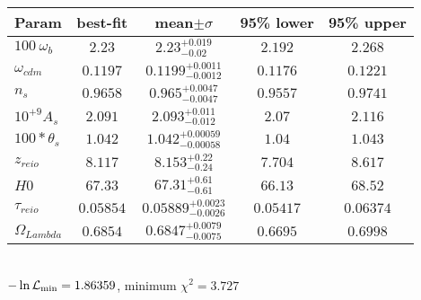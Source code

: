\begin{tabular}{|l|c|c|c|c|} 
 \hline 
Param & best-fit & mean$\pm\sigma$ & 95\% lower & 95\% upper \\ \hline 
$100~\omega{}_{b }$ &$2.23$ & $2.23_{-0.02}^{+0.019}$ & $2.192$ & $2.268$ \\ 
$\omega{}_{cdm }$ &$0.1197$ & $0.1199_{-0.0012}^{+0.0011}$ & $0.1176$ & $0.1221$ \\ 
$n_{s }$ &$0.9658$ & $0.965_{-0.0047}^{+0.0047}$ & $0.9557$ & $0.9741$ \\ 
$10^{+9}A_{s }$ &$2.091$ & $2.093_{-0.012}^{+0.011}$ & $2.07$ & $2.116$ \\ 
$100*\theta{}_{s }$ &$1.042$ & $1.042_{-0.00058}^{+0.00059}$ & $1.04$ & $1.043$ \\ 
$z_{reio }$ &$8.117$ & $8.153_{-0.24}^{+0.22}$ & $7.704$ & $8.617$ \\ 
$H0$ &$67.33$ & $67.31_{-0.61}^{+0.61}$ & $66.13$ & $68.52$ \\ 
$\tau{}_{reio }$ &$0.05854$ & $0.05889_{-0.0026}^{+0.0023}$ & $0.05417$ & $0.06374$ \\ 
$\Omega{}_{Lambda }$ &$0.6854$ & $0.6847_{-0.0075}^{+0.0079}$ & $0.6695$ & $0.6998$ \\ 
\hline 
 \end{tabular} \\ 
$-\ln{\cal L}_\mathrm{min} =1.86359$, minimum $\chi^2=3.727$ \\ 
